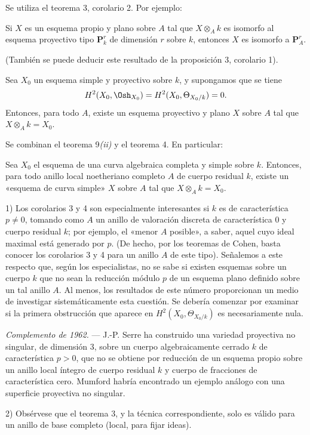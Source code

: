 Se utiliza el teorema 3, corolario 2. Por ejemplo:

 Si $X$ es un esquema propio y plano sobre $A$ tal que
$X\otimes_A k$ es isomorfo al esquema proyectivo tipo $\mathbf P_k^r$ de
dimensión $r$ sobre $k$, entonces $X$ es isomorfo a $\mathbf P_A^r$.

(También se puede deducir este resultado de la proposición 3, corolario 1).

 Sea $X_0$ un esquema simple y proyectivo sobre $k$, y
supongamos que se tiene
\[
  H^2(X_0,\Osh_{X_0})=H^2(X_0,\Theta_{X_0/k})=0.
\]
Entonces, para todo $A$, existe un esquema proyectivo y plano $X$ sobre $A$ tal
que $X\otimes_A k=X_0$.

Se combinan el teorema 9\textit{(ii)} y el teorema 4. En particular:

 Sea $X_0$ el esquema de una curva algebraica completa y
simple sobre $k$. Entonces, para todo anillo local noetheriano completo $A$ de
cuerpo residual $k$, existe un «esquema de curva simple» $X$ sobre $A$ tal que
$X\otimes_A k=X_0$.


1) Los corolarios 3 y 4 son especialmente interesantes si $k$ es de
característica $p\ne0$, tomando como $A$ un anillo de valoración discreta de
característica $0$ y cuerpo residual $k$; por ejemplo, el «menor $A$ posible»,
a saber, aquel cuyo ideal maximal está generado por $p$. (De hecho, por los
teoremas de Cohen, basta conocer los corolarios 3 y 4 para un anillo $A$ de este
tipo). Señalemos a este respecto que, según los especialistas, no se sabe si
existen esquemas sobre un cuerpo $k$ que no sean la reducción módulo $p$ de un
esquema plano definido sobre un tal anillo $A$. Al menos, los resultados de este
número proporcionan un medio de investigar sistemáticamente esta cuestión. Se
debería comenzar por examinar si la primera obstrucción que aparece en
$H^2(X_0,\Theta_{X_0/k})$ es necesariamente nula.

\emph{Complemento de 1962.} --- J.-P. Serre ha construido una variedad
proyectiva no singular, de dimensión 3, sobre un cuerpo algebraicamente cerrado
$k$ de característica $p>0$, que no se obtiene por reducción de un esquema
propio sobre un anillo local íntegro de cuerpo residual $k$ y cuerpo de
fracciones de característica cero. Mumford habría encontrado un ejemplo análogo
con una superficie proyectiva no singular.

2) Obsérvese que el teorema 3, y la técnica correspondiente, solo es válido para
un anillo de base completo (local, para fijar ideas).

